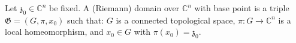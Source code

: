 Let $\mathfrak{z}_0 \in \mathbb{C}^n$ be fixed. A (Riemann) domain over $\mathbb{C}^n$ with base point is a triple $\mathfrak{G} = (G, \pi, x_0)$ such that: $G$ is a connected topological space, $\pi: G \to \mathbb{C}^n$ is a local homeomorphism, and $x_0 \in G$ with $\pi(x_0) = \mathfrak{z}_0$.
